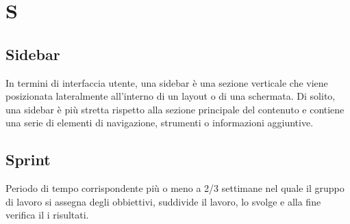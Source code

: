 \section{S}
\subsection{Sidebar}
In termini di interfaccia utente, una sidebar è una sezione verticale che viene posizionata lateralmente all'interno di un layout o di una schermata. Di solito, una sidebar è più stretta rispetto alla sezione principale del contenuto e contiene una serie di elementi di navigazione, strumenti o informazioni aggiuntive.

\subsection{Sprint}%
Periodo di tempo corrispondente più o meno a 2/3 settimane nel quale il gruppo di lavoro si assegna degli obbiettivi, suddivide il lavoro, lo svolge e alla fine verifica il i risultati.

\clearpage